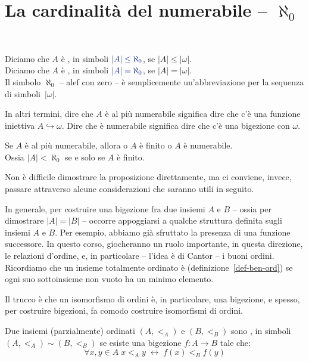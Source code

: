 \section{La cardinalit\`a del numerabile -- $\aleph_0$}
\ 

\begin{definition}
	Diciamo che $A$ \`e , in simboli
$\drkblu |A|\leq\aleph_0$, se $|A| \leq |\omega|$.\\
	Diciamo che $A$ \`e , in simboli $\drkblu
|A|=\aleph_0$, se $|A| = |\omega|$.\\
	{\drkgrn Il simbolo $\aleph_0$ -- alef con zero -- \`e
semplicemente un'abbreviazione per la sequenza di simboli~$|\omega|$.}
\end{definition}

\begin{remark}
	In altri termini, dire che $A$ \`e al pi\`u numerabile significa dire che c'\`e una funzione iniettiva $A \hookrightarrow \omega$. Dire che \`e numerabile significa dire che c'\`e una bigezione con $\omega$.
\end{remark}

\begin{proposition}\label{dic-num}
	Se $A$ \`e al pi\`u numerabile, allora o $A$ \`e finito o $A$ \`e
numerabile.\\
{\drkgrn Ossia $|A| < \aleph_0$ se e solo se $A$ \`e finito.}
\end{proposition}

Non \`e difficile dimostrare la proposizione direttamente, ma ci conviene, invece, passare attraverso alcune considerazioni che saranno utili in seguito.

In generale, per costruire una bigezione fra due insiemi $A$ e $B$ --
ossia per dimostrare $|A| = |B|$ -- occorre appoggiarsi a qualche struttura definita sugli insiemi $A$
e $B$. Per esempio, abbiamo gi\`a sfruttato la presenza di una funzione successore.
In questo corso, giocheranno un ruolo importante, in questa direzione, le
relazioni d'ordine, e, in particolare -- l'idea \`e di Cantor -- i 
buoni ordini. Ricordiamo che un insieme totalmente ordinato \`e
(definizione~\ref{def-ben-ord}) se ogni suo sottoinsieme non vuoto ha un
minimo elemento.

Il trucco \`e che un isomorfismo di ordini \`e, in particolare, una
bigezione, e spesso, per costruire bigezioni, fa comodo costruire isomorfismi di ordini.

\begin{definition}
	Due insiemi (parzialmente) ordinati
	$(A,<_A)$ e $(B,<_B)$ sono , in simboli $(A,<_A)
\sim (B,<_B)$ se esiste una bigezione $f\colon A \to B$ tale che:
	\[ \forall {x,y \in A} \; x <_A y \; \leftrightarrow \; f(x) <_B f(y)
		\]
\end{definition}

